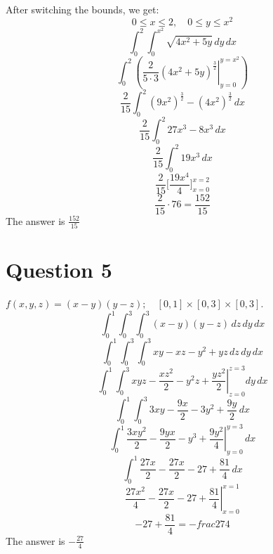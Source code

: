 \documentclass[hidelinks]{article}
\begin{document}
\begin{center}

\end{center}
After switching the bounds, we get:
\[
    0 \leq x \leq 2, \quad 0 \leq y \leq x^2
\]
\[
    \int_0^2 \int_0^{x^2} \sqrt{4x^2 + 5y} \, dy \, dx
\]
\[
    \int_0^2 \left( \left .\frac{2}{5\cdot3} (4x^2+5y)^\frac{3}{2} \right|_{y= 0}^{y=x^2} \right)
\]
\[ 
    \frac{2}{15}\int_0^2 (9x^2)^{\frac{3}{2}} - (4x^2)^{\frac{3}{2}} \, dx
\]
\[
    \frac{2}{15}\int_0^2 27x^3 - 8x^3 \, dx
\]
\[
    \frac{2}{15}\int_0^2 19x^3 \, dx
\]
\[
    \frac{2}{15} \Big[ \frac{19x^4}{4} \Big]_{x = 0}^{x = 2}
\]
\[
    \frac{2}{15} \cdot 76 = \frac{152}{15}
\]
The answer is $\frac{152}{15}$
\newpage
\section{Question 5}
$f(x, y, z) = (x-y)(y-z); \quad [0,1] \times [0,3] \times [0,3]$. 
\[
    \int_0^1 \int_0^3 \int_0^3 (x-y)(y-z) \,dz \, dy \, dx
\]
\[
    \int_0^1 \int_0^3 \int_0^3 xy-xz-y^2+yz \,dz \, dy \, dx
\]
\[
    \int_0^1 \int_0^3 \left . xyz-\frac{xz^2}{2}-y^2z+\frac{yz^2}{2} \right |_{z=0}^{z=3} dy \, dx
\]
\[
    \int_0^1 \int_0^3 3xy-\frac{9x}{2}-3y^2+\frac{9y}{2} \, dx
\]
\[
    \int_0^1 \left. \frac{3xy^2}{2}-\frac{9yx}{2}-y^3+\frac{9y^2}{4} \right|_{y=0}^{y=3} \, dx
\]
\[
    \int_0^1 \frac{27x}{2}-\frac{27x}{2}-27+\frac{81}{4} \, dx
\]
\[
    \left. \frac{27x^2}{4}-\frac{27x}{2}-27+\frac{81}{4} \right |_{x = 0}^{x=1}
\]
\[
    -27 + \frac{81}{4} = -frac{27}{4}
\]
The answer is $-\frac{27}{4}$
\newpage
\end{document}
